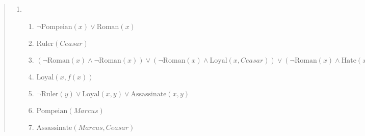 \documentclass{article}
\theoremstyle{definition}
\newcommand{\<}{\langle}
\renewcommand{\>}{\rangle}
\begin{document}
\begin{enumerate}[label=\textbf{\arabic*.}]
\begin{quote}
\begin{enumerate}
      \begin{enumerate}[label=\arabic*.]
        \item $\forall x(\text{Pompeian}(x) \rightarrow \text{Roman}(x))$ (Premise)
        \item $\text{Ruler}(Ceasar)$ (Premise)
        \item $\forall x(\text{Roman}(x) \rightarrow ((\text{Loyal}(x,Ceasar) \land \neg \text{Hate}(x,Ceasar)) \lor(\text{Hate}(x,Ceasar) \land \neg \text{Loyal}(x,Ceasar))))$ (Premise)
        \item $\forall x \forall y((\text{Ruler}(y) \land \neg \text{Loyal}(x,y)) \rightarrow \text{Assassinate}(x,y))$ (Premise)
        \item $\text{Pompeian}(Marcus)$ (Premise)
        \item $\text{Assassinate}(Marcus,Ceasar)$ (Premise)
        \item $\text{Roman}(Marcus)$ (Modus Ponens of 1 and 5 using substitution $x/Marcus$)
        \item $(\text{Loyal}(Marcus,Ceasar) \land \neg \text{Hate}(Marcus,Ceasar)) \lor(\text{Hate}(Marcus,Ceasar) \land \neg \text{Loyal}(Marcus,Ceasar))$ (Modus Ponens of 3 and 7 using substitution $x/Marcus$)
        \item $\neg \text{Loyal}(Marcus, Ceasar) \land \text{Ruler}(Ceasar)$ (Modus Tollens of 4 and 6 using substitution $x/Marcus$, $y/Ceasar$)
        \item $\neg \text{Loyal}(Marcus, Ceasar)$ (Simplification of 9)
        \item $\text{Hate}(Marcus,Ceasar) \land \neg \text{Loyal}(Marcus,Ceasar)$ (Disjunctive Syllogism of 8 and 10)
        \item $\text{Hate}(Marcus,Ceasar)$ (Simplification of 11)
    \end{enumerate}

  \item 
    \begin{enumerate}
    \item $\neg\text{Pompeian}(x) \lor \text{Roman}(x)$
    \item $\text{Ruler}(Ceasar)$
    \item $(\neg\text{Roman}(x) \land \neg\text{Roman}(x)) \lor (\neg\text{Roman}(x) \land \text{Loyal}(x,Ceasar)) \lor (\neg\text{Roman}(x) \land \text{Hate}(x,Ceasar)) \lor (\neg\text{Hate}(x,Ceasar) \land \text{Loyal}(x,Ceasar)) \lor (\neg\text{Hate}(x,Ceasar) \land \text{Hate}(x,Ceasar))$
    \item $\text{Loyal}(x,f(x))$
    \item $\neg\text{Ruler}(y) \lor \text{Loyal}(x,y) \lor \text{Assassinate}(x,y)$
    \item $\text{Pompeian}(Marcus)$
    \item $\text{Assassinate}(Marcus,Ceasar)$
    \end{enumerate}
\end{enumerate}


\end{quote}
\end{enumerate}
\end{document}
